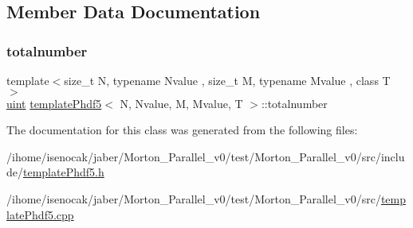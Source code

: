 \subsection{Member Data Documentation}
\mbox{\label{classtemplatePhdf5_a9de9eb2740b4feb7029e3741cf349a90}} 
\subsubsection{\texorpdfstring{totalnumber}{totalnumber}}
{\footnotesize\ttfamily template$<$size\+\_\+t N, typename Nvalue , size\+\_\+t M, typename Mvalue , class T $>$ \\
\mbox{\hyperlink{definitions_8h_a69aa29b598b851b0640aa225a9e5d61d}{uint}} \mbox{\hyperlink{classtemplatePhdf5}{template\+Phdf5}}$<$ N, Nvalue, M, Mvalue, T $>$\+::totalnumber\hspace{0.3cm}{\ttfamily [private]}}



The documentation for this class was generated from the following files\+:\begin{DoxyCompactItemize}
\item 
/ihome/isenocak/jaber/\+Morton\+\_\+\+Parallel\+\_\+v0/test/\+Morton\+\_\+\+Parallel\+\_\+v0/src/include/\mbox{\hyperlink{templatePhdf5_8h}{template\+Phdf5.\+h}}\item 
/ihome/isenocak/jaber/\+Morton\+\_\+\+Parallel\+\_\+v0/test/\+Morton\+\_\+\+Parallel\+\_\+v0/src/\mbox{\hyperlink{templatePhdf5_8cpp}{template\+Phdf5.\+cpp}}\end{DoxyCompactItemize}
